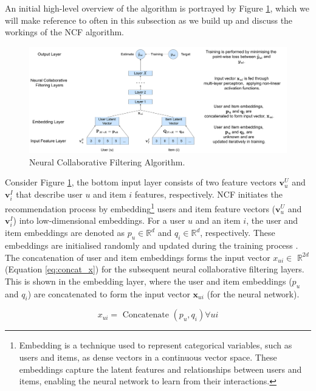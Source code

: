  An initial high-level overview of the algorithm is portrayed by Figure \ref{fig:NCF algorithm}, which we will make reference to often in this subsection as we build up and discuss the workings of the NCF algorithm.

\begin{figure}[h]
  \centering
  \includegraphics[width=0.9999\textwidth]{Figures/flowchart of model process-NCF-6.pdf} %
  \caption{Neural Collaborative Filtering Algorithm.}
  \label{fig:NCF algorithm}
\end{figure}

Consider Figure \ref{fig:NCF algorithm}, the bottom input layer consists of two feature vectors $\mathbf{v}_u^U$ and $\mathbf{v}_i^I$ that describe user $u$ and item $i$ features, respectively. NCF initiates the recommendation process by embedding\footnote{Embedding is a technique used to represent categorical variables, such as users and items, as dense vectors in a continuous vector space. These embeddings capture the latent features and relationships between users and items, enabling the neural network to learn from their interactions.} users and item feature vectors ($\mathbf{v}_u^U$ and $\mathbf{v}_i^I$) into low-dimensional embeddings. For a user $u$ and an item $i$, the user and item embeddings are denoted as $p_u \in \mathbb{R}^d$ and $q_i \in \mathbb{R}^d$, respectively. These embeddings are initialised randomly and updated during the training process \cite{he2017neural}. The concatenation of user and item embeddings forms the input vector $x_{u i} \in$ $\mathbb{R}^{2 d} $ (Equation \ref{eq:concat_x}) for the subsequent neural collaborative filtering layers. This is shown in the embedding layer, where the user and item embeddings ($p_u$ and $q_i$) are concatenated to form the input vector $\mathbf{x}_{ui}$ (for the neural network).

\begin{equation}
    \label{eq:concat_x}
    x_{u i}=\text { Concatenate }\left(p_u, q_i\right) \forall u i
\end{equation}


